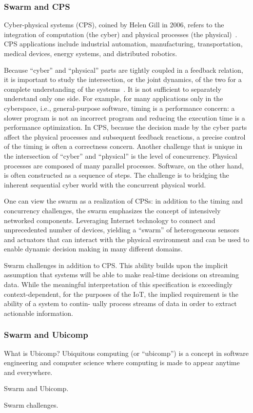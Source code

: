 \subsubsection{Swarm and CPS}
\label{sec:swarm-cps}

Cyber-physical systems (CPS), coined by Helen Gill in 2006, refers to the
integration of computation (the cyber) and physical processes (the
physical)~\cite{lee2015past}. CPS applications include industrial automation,
manufacturing, transportation, medical devices, energy systems, and distributed
robotics.

Because ``cyber'' and ``physical'' parts are tightly coupled in a feedback
relation, it is important to study the intersection, or the joint dynamics, of
the two for a complete understanding of the systems~\cite{rajkumar2010cyber}. It
is not sufficient to separately understand only one side. For example, for many
applications only in the cyberspace, i.e., general-purpose software, timing is a
performance concern: a slower program is not an incorrect program and reducing
the execution time is a performance optimization. In CPS, because the decision
made by the cyber parts affect the physical processes and subsequent feedback
reactions, a precise control of the timing is often a correctness
concern. Another challenge that is unique in the intersection of ``cyber'' and
``physical'' is the level of concurrency. Physical processes are composed of
many parallel processes. Software, on the other hand, is often constructed as a
sequence of steps. The challenge is to bridging the inherent sequential cyber
world with the concurrent physical world.

One can view the swarm as a realization of CPSs: in addition to the timing and
concurrency challenges, the swarm emphasizes the concept of intensively
networked components. Leveraging Internet technology to connect and
unprecedented number of devices, yielding a ``swarm'' of heterogeneous sensors
and actuators that can interact with the physical environment and can be used to
enable dynamic decision making in many different domains. 

Swarm challenges in addition to CPS. This ability builds upon the implicit
assumption that systems will be able to make real-time decisions on streaming
data. While the meaningful interpretation of this specification is exceedingly
context-dependent, for the purposes of the IoT, the implied requirement is the
ability of a system to contin- ually process streams of data in order to extract
actionable information.

\subsubsection{Swarm and Ubicomp}
\label{sec:swarm-wsn}

What is Ubicomp? Ubiquitous computing (or ``ubicomp'') is a concept in software
engineering and computer science where computing is made to appear anytime and
everywhere.

Swarm and Ubicomp.

Swarm challenges.

